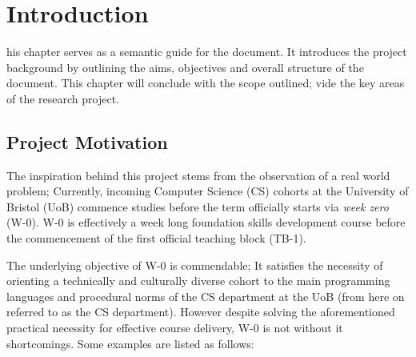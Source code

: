 %
%
\let\textcircled=\pgftextcircled
\chapter{Introduction}
\label{chap:intro}

his chapter serves as a semantic guide for the document. It introduces the project background by outlining the aims, objectives and overall structure of the document. This chapter will conclude with the scope  outlined; vide the key areas of the research project.


\section{Project Motivation}
\label{sec:sec01}


The inspiration behind this project stems from the observation of a real world problem; Currently, incoming Computer Science (CS) cohorts at the University of Bristol (UoB) commence studies before the term officially starts via \textit{week zero} (W-0). W-0 is effectively a week long foundation skills development course before the commencement of the first official teaching block (TB-1).

The underlying objective of W-0 is commendable; It satisfies the necessity of orienting a technically and culturally diverse cohort to the main programming languages and procedural norms of the CS department at the UoB (from here on referred to as the CS department). However despite solving the aforementioned practical necessity for effective course delivery, W-0 is not without it shortcomings. Some examples are listed as follows:

